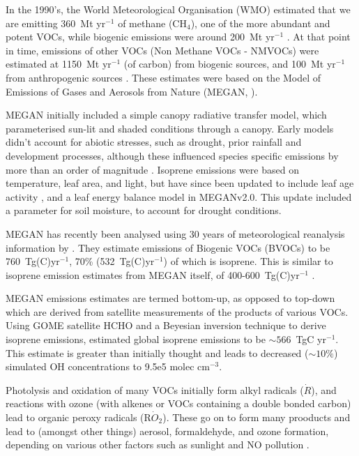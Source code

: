     In the 1990's, the World Meteorological Organisation (WMO) estimated that we are emitting 360~Mt yr$^{-1}$ of methane (CH$_4$), one of the more abundant and potent VOCs, while biogenic emissions were around 200~Mt yr$^{-1}$ \citep{Atkinson2000}.
    At that point in time, emissions of other VOCs (Non Methane VOCs - NMVOCs) were estimated at 1150~Mt yr$^{-1}$ (of carbon) from biogenic sources, and 100~Mt yr$^{-1}$ from anthropogenic sources \citep{Guenther1995, Atkinson2000}.
    These estimates were based on the Model of Emissions of Gases and Aerosols from Nature (MEGAN, \citet{Guenther1995}).
    
    MEGAN initially included a simple canopy radiative transfer model, which parameterised sun-lit and shaded conditions through a canopy.
    Early models didn't account for abiotic stresses, such as drought, prior rainfall and development processes, although these influenced species specific emissions by more than an order of magnitude \citep{Niinemets1999}.
    Isoprene emissions were based on temperature, leaf area, and light, but have since been updated to include leaf age activity \citep{Guenther2000}, and a leaf energy balance model \citep{Guenther2006} in MEGANv2.0.
    This update included a parameter for soil moisture, to account for drought conditions.
    
    MEGAN has recently been analysed using 30 years of meteorological reanalysis information by \citet{Sindelarova2014}.
    They estimate emissions of Biogenic VOCs (BVOCs) to be 760~Tg(C)yr$^{-1}$, 70\% (532~Tg(C)yr$^{-1}$) of which is isoprene.
    This is similar to isoprene emission estimates from MEGAN itself, of 400-600~Tg(C)yr$^{-1}$ \citep{Guenther2006}.
    
    MEGAN emissions estimates are termed bottom-up, as opposed to top-down which are derived from satellite measurements of the products of various VOCs.
    Using GOME satellite HCHO and a Beyesian inversion technique to derive isoprene emissions, \citet{Shim2005} estimated global isoprene emissions to be $\sim566$~TgC yr$^{-1}$. 
    This estimate is greater than initially thought and leads to decreased ($\sim10\%$) simulated OH concentrations to 9.5e5 molec cm$^{-3}$.
    
    Photolysis and oxidation of many VOCs initially form alkyl radicals ($\dot{R}$), and reactions with ozone (with alkenes or VOCs containing a double bonded carbon) lead to organic peroxy radicals (R$\dot{O}_2$). 
    These go on to form many prooducts and lead to (amongst other things) aerosol, formaldehyde, and ozone formation, depending on various other factors such as sunlight and NO pollution \citep{Atkinson2000}.
    
